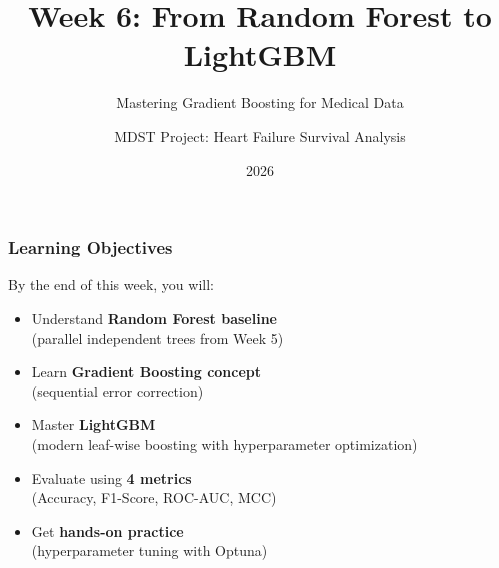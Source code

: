 \documentclass{beamer}
\title{Week 6: From Random Forest to LightGBM}
\subtitle{Mastering Gradient Boosting for Medical Data}
\author{MDST Project: Heart Failure Survival Analysis}
\date{2026}
\begin{document}
\frame{\titlepage}

\begin{frame}[fragile]
\frametitle{Learning Objectives}

By the end of this week, you will:

\begin{itemize}
    \item[\checkmark] Understand \textbf{Random Forest baseline} \\
    \quad (parallel independent trees from Week 5)

    \vspace{0.3cm}
    \item[\checkmark] Learn \textbf{Gradient Boosting concept} \\
    \quad (sequential error correction)

    \vspace{0.3cm}
    \item[\checkmark] Master \textbf{LightGBM} \\
    \quad (modern leaf-wise boosting with hyperparameter optimization)

    \vspace{0.3cm}
    \item[\checkmark] Evaluate using \textbf{4 metrics} \\
    \quad (Accuracy, F1-Score, ROC-AUC, MCC)

    \vspace{0.3cm}
    \item[\checkmark] Get \textbf{hands-on practice} \\
    \quad (hyperparameter tuning with Optuna)
\end{itemize}

\end{frame}
\end{document}
